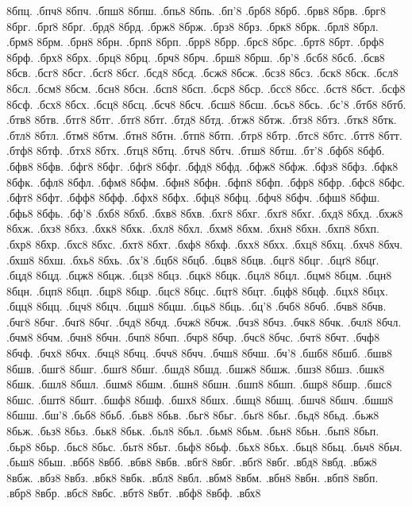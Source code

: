 {8бпц.
.бпч8
8бпч.
.бпш8
8бпш.
.бпь8
8бпь.
.бп'8
.брб8
8брб.
.брв8
8брв.
.брг8
8брг.
.брґ8
8брґ.
.брд8
8брд.
.брж8
8брж.
.брз8
8брз.
.брк8
8брк.
.брл8
8брл.
.брм8
8брм.
.брн8
8брн.
.брп8
8брп.
.брр8
8брр.
.брс8
8брс.
.брт8
8брт.
.брф8
8брф.
.брх8
8брх.
.брц8
8брц.
.брч8
8брч.
.брш8
8брш.
.бр'8
.бсб8
8бсб.
.бсв8
8бсв.
.бсг8
8бсг.
.бсґ8
8бсґ.
.бсд8
8бсд.
.бсж8
8бсж.
.бсз8
8бсз.
.бск8
8бск.
.бсл8
8бсл.
.бсм8
8бсм.
.бсн8
8бсн.
.бсп8
8бсп.
.бср8
8бср.
.бсс8
8бсс.
.бст8
8бст.
.бсф8
8бсф.
.бсх8
8бсх.
.бсц8
8бсц.
.бсч8
8бсч.
.бсш8
8бсш.
.бсь8
8бсь.
.бс'8
.бтб8
8бтб.
.бтв8
8бтв.
.бтг8
8бтг.
.бтґ8
8бтґ.
.бтд8
8бтд.
.бтж8
8бтж.
.бтз8
8бтз.
.бтк8
8бтк.
.бтл8
8бтл.
.бтм8
8бтм.
.бтн8
8бтн.
.бтп8
8бтп.
.бтр8
8бтр.
.бтс8
8бтс.
.бтт8
8бтт.
.бтф8
8бтф.
.бтх8
8бтх.
.бтц8
8бтц.
.бтч8
8бтч.
.бтш8
8бтш.
.бт'8
.бфб8
8бфб.
.бфв8
8бфв.
.бфг8
8бфг.
.бфґ8
8бфґ.
.бфд8
8бфд.
.бфж8
8бфж.
.бфз8
8бфз.
.бфк8
8бфк.
.бфл8
8бфл.
.бфм8
8бфм.
.бфн8
8бфн.
.бфп8
8бфп.
.бфр8
8бфр.
.бфс8
8бфс.
.бфт8
8бфт.
.бфф8
8бфф.
.бфх8
8бфх.
.бфц8
8бфц.
.бфч8
8бфч.
.бфш8
8бфш.
.бфь8
8бфь.
.бф'8
.бхб8
8бхб.
.бхв8
8бхв.
.бхг8
8бхг.
.бхґ8
8бхґ.
.бхд8
8бхд.
.бхж8
8бхж.
.бхз8
8бхз.
.бхк8
8бхк.
.бхл8
8бхл.
.бхм8
8бхм.
.бхн8
8бхн.
.бхп8
8бхп.
.бхр8
8бхр.
.бхс8
8бхс.
.бхт8
8бхт.
.бхф8
8бхф.
.бхх8
8бхх.
.бхц8
8бхц.
.бхч8
8бхч.
.бхш8
8бхш.
.бхь8
8бхь.
.бх'8
.бцб8
8бцб.
.бцв8
8бцв.
.бцг8
8бцг.
.бцґ8
8бцґ.
.бцд8
8бцд.
.бцж8
8бцж.
.бцз8
8бцз.
.бцк8
8бцк.
.бцл8
8бцл.
.бцм8
8бцм.
.бцн8
8бцн.
.бцп8
8бцп.
.бцр8
8бцр.
.бцс8
8бцс.
.бцт8
8бцт.
.бцф8
8бцф.
.бцх8
8бцх.
.бцц8
8бцц.
.бцч8
8бцч.
.бцш8
8бцш.
.бць8
8бць.
.бц'8
.бчб8
8бчб.
.бчв8
8бчв.
.бчг8
8бчг.
.бчґ8
8бчґ.
.бчд8
8бчд.
.бчж8
8бчж.
.бчз8
8бчз.
.бчк8
8бчк.
.бчл8
8бчл.
.бчм8
8бчм.
.бчн8
8бчн.
.бчп8
8бчп.
.бчр8
8бчр.
.бчс8
8бчс.
.бчт8
8бчт.
.бчф8
8бчф.
.бчх8
8бчх.
.бчц8
8бчц.
.бчч8
8бчч.
.бчш8
8бчш.
.бч'8
.бшб8
8бшб.
.бшв8
8бшв.
.бшг8
8бшг.
.бшґ8
8бшґ.
.бшд8
8бшд.
.бшж8
8бшж.
.бшз8
8бшз.
.бшк8
8бшк.
.бшл8
8бшл.
.бшм8
8бшм.
.бшн8
8бшн.
.бшп8
8бшп.
.бшр8
8бшр.
.бшс8
8бшс.
.бшт8
8бшт.
.бшф8
8бшф.
.бшх8
8бшх.
.бшц8
8бшц.
.бшч8
8бшч.
.бшш8
8бшш.
.бш'8
.бьб8
8бьб.
.бьв8
8бьв.
.бьг8
8бьг.
.бьґ8
8бьґ.
.бьд8
8бьд.
.бьж8
8бьж.
.бьз8
8бьз.
.бьк8
8бьк.
.бьл8
8бьл.
.бьм8
8бьм.
.бьн8
8бьн.
.бьп8
8бьп.
.бьр8
8бьр.
.бьс8
8бьс.
.бьт8
8бьт.
.бьф8
8бьф.
.бьх8
8бьх.
.бьц8
8бьц.
.бьч8
8бьч.
.бьш8
8бьш.
.вбб8
8вбб.
.вбв8
8вбв.
.вбг8
8вбг.
.вбґ8
8вбґ.
.вбд8
8вбд.
.вбж8
8вбж.
.вбз8
8вбз.
.вбк8
8вбк.
.вбл8
8вбл.
.вбм8
8вбм.
.вбн8
8вбн.
.вбп8
8вбп.
.вбр8
8вбр.
.вбс8
8вбс.
.вбт8
8вбт.
.вбф8
8вбф.
.вбх8
}

